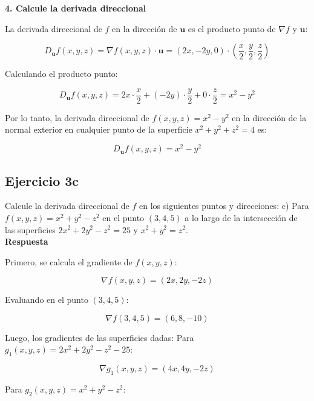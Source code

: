 \documentclass{report}
\begin{document}
                        \textbf{4. Calcule la derivada direccional}
                        
                        La derivada direccional de \( f \) en la dirección de \( \mathbf{u} \) es el producto punto de \( \nabla f \) y \( \mathbf{u} \):
                        
                        \[
                        D_{\mathbf{u}} f(x, y, z) = \nabla f(x, y, z) \cdot \mathbf{u} = (2x, -2y, 0) \cdot \left( \frac{x}{2}, \frac{y}{2}, \frac{z}{2} \right)
                        \]
                        
                        Calculando el producto punto:
                        
                        \[
                        D_{\mathbf{u}} f(x, y, z) = 2x \cdot \frac{x}{2} + (-2y) \cdot \frac{y}{2} + 0 \cdot \frac{z}{2} = x^2 - y^2
                        \]
                        
                        Por lo tanto, la derivada direccional de \( f(x, y, z) = x^2 - y^2 \) en la dirección de la normal exterior en cualquier punto de la superficie \( x^2 + y^2 + z^2 = 4 \) es:
                        
                        \[
                        D_{\mathbf{u}} f(x, y, z) = x^2 - y^2
                        \]\subsection*{Ejercicio 3c}
    Calcule la derivada direccional de \( f \) en los siguientes puntos y direcciones:
    c) Para \( f(x, y, z) = x^2 + y^2 - z^2 \) en el punto \((3,4,5)\) a lo largo de la intersección de las superficies \( 2 x^2 + 2 y^2 - z^2 = 25 \) y \( x^2 + y^2 = z^2 \).\\
    \textbf{Respuesta}

    Primero, se calcula el gradiente de \( f(x, y, z) \):

    \[
    \nabla f(x, y, z) = (2x, 2y, -2z)
    \]

    Evaluando en el punto \((3,4,5)\):

    \[
    \nabla f(3, 4, 5) = (6, 8, -10)
    \]

    Luego, los gradientes de las superficies dadas:
    Para \( g_1(x, y, z) = 2x^2 + 2y^2 - z^2 - 25 \):

    \[
    \nabla g_1(x, y, z) = (4x, 4y, -2z)
    \]

    Para \( g_2(x, y, z) = x^2 + y^2 - z^2 \):
\end{document}
